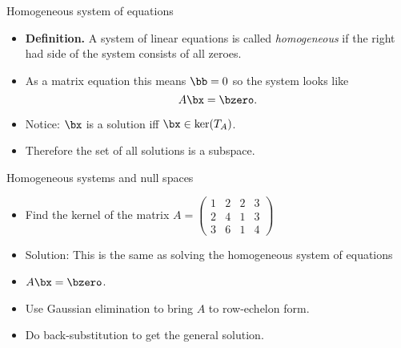 \documentclass{beamer}
\begin{document}
\begin{frame}{Homogeneous system of equations}

\begin{itemize}
\item \textbf{Definition.} A system of linear equations is called
\emph{homogeneous} if the right had side of the system consists of all zeroes.
\item As a matrix equation this means $\bb=0$ so the system looks like
$$A\bx=\bzero.$$
\item Notice: $\bx$ is a solution iff $\bx\in\ker(T_A)$.
\item Therefore the set of all solutions is a subspace.
\end{itemize}

\end{frame}

\begin{frame}{Homogeneous systems and null spaces}
\begin{itemize}
\item Find the kernel of the matrix
$A=
\begin{pmatrix}
1 & 2 & 2 & 3 \\
2 & 4 & 1 & 3 \\
3 & 6 & 1 & 4
\end{pmatrix}
$
\item Solution: This is the same as solving the homogeneous system of equations
\item $A\bx=\bzero$.
\item Use Gaussian elimination to bring $A$ to row-echelon form.
\item Do back-substitution to get the general solution.
\end{itemize}
\end{frame}
\end{document}
